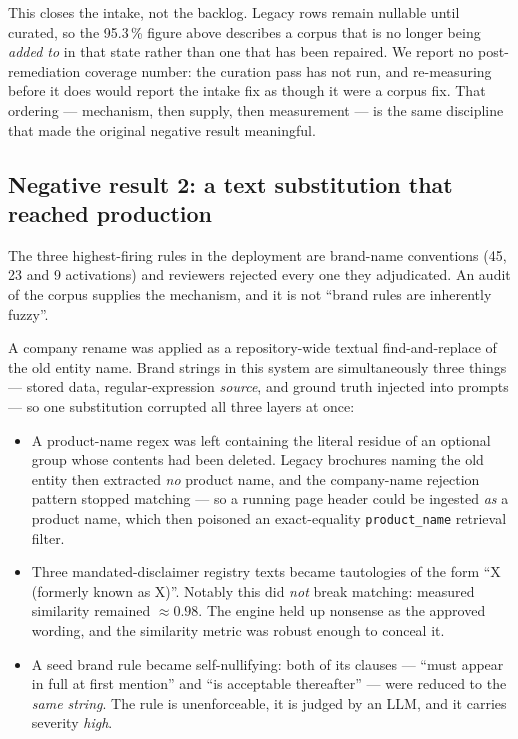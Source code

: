 \documentclass[10pt]{article}
\newcommand{\code}[1]{\texttt{\small #1}}
\begin{document}
This closes the intake, not the backlog. Legacy rows remain nullable until
curated, so the 95.3\,\% figure above describes a corpus that is no longer being
\emph{added to} in that state rather than one that has been repaired. We report
no post-remediation coverage number: the curation pass has not run, and
re-measuring before it does would report the intake fix as though it were a
corpus fix. That ordering --- mechanism, then supply, then measurement --- is
the same discipline that made the original negative result meaningful.

\subsection{Negative result 2: a text substitution that reached production}
\label{sec:brand}

The three highest-firing rules in the deployment are brand-name conventions
(45, 23 and 9 activations) and reviewers rejected every one they adjudicated.
An audit of the corpus supplies the mechanism, and it is not ``brand rules are
inherently fuzzy''.

A company rename was applied as a repository-wide textual find-and-replace of
the old entity name. Brand strings in this system are simultaneously three
things --- stored data, regular-expression \emph{source}, and ground truth
injected into prompts --- so one substitution corrupted all three layers at
once:

\begin{itemize}
  \item A product-name regex was left containing the literal residue of an
        optional group whose contents had been deleted. Legacy brochures
        naming the old entity then extracted \emph{no} product name, and the
        company-name rejection pattern stopped matching --- so a running page
        header could be ingested \emph{as} a product name, which then poisoned
        an exact-equality \code{product\_name} retrieval filter.
  \item Three mandated-disclaimer registry texts became tautologies of the form
        ``X (formerly known as X)''. Notably this did \emph{not} break
        matching: measured similarity remained $\approx 0.98$. The engine held
        up nonsense as the approved wording, and the similarity metric was
        robust enough to conceal it.
  \item A seed brand rule became self-nullifying: both of its clauses ---
        ``must appear in full at first mention'' and ``is acceptable
        thereafter'' --- were reduced to the \emph{same string}. The rule is
        unenforceable, it is judged by an LLM, and it carries severity
        \emph{high}.
\end{itemize}
\end{document}
